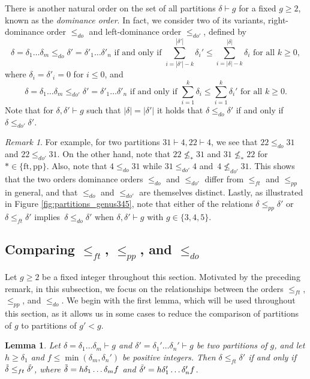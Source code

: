 \documentclass[11pt]{amsart}
\numberwithin{equation}{section}
\theoremstyle{plain}
\newcommand{\<}{\left \langle}
\renewcommand{\>}{\right \rangle}
\newtheorem{lem}[thm]{Lemma}
\theoremstyle{definition}
\theoremstyle{remark}
\newtheorem{rem}[thm]{Remark}
\begin{document}
There is another natural order on the set of all partitions $\delta \vdash g$ for a fixed $g\geq 2$, known as the \emph{dominance order}. In fact, we consider two of its variants, right-dominance order $\leq_{do}$ and left-dominance order $\leq_{do'}$, defined by
$$\delta = \delta_1\ldots\delta_m \leq_{do} \delta' = \delta'_1\ldots\delta'_n \text{ if and only if } \sum_{i = |\delta'| - k}^{|\delta'|} \delta_{i}' \leq \sum_{i = |\delta| - k}^{|\delta|} \delta_{i} \text{ for all } k \geq 0, $$
where $\delta_{i} = \delta'_{i} = 0$ for $i \leq 0$, and
$$\delta = \delta_1\ldots\delta_m \leq_{do'} \delta' = \delta'_1\ldots\delta'_n \text{ if and only if }\sum_{i = 1}^k \delta_{i} \leq \sum_{i = 1}^k \delta_{i}' \text{ for all } k \geq 0.$$
Note that for $\delta, \delta' \vdash g$ such that $|\delta| = |\delta'|$ it holds that $\delta \leq_{do} \delta'$ if and only if $\delta \leq_{do'} \delta'$. 
\begin{rem}
\label{rem:do}
For example, for two partitions $31\vdash 4, 22 \vdash 4$, we see that $22 \leq_{do} 31$ and $22 \leq_{do'} 31$. On the other hand, note that $22 \not\leq_{*} 31$ and $31 \not\leq_{*} 22$ for $* \in \{\text{ft}, \text{pp}\}$. Also, note that $4 \leq_{do} 31$ while $31 \leq_{do'} 4$ and~$4 \not \leq_{do'} 31$.
This shows that the two orders dominance orders $\leq_{do}$ and $\leq_{do'}$ differ from $\leq_{ft}$ and $\leq_{pp}$ in general, and that $\leq_{do}$ and $\leq_{do'}$ are themselves distinct. Lastly, as illustrated in Figure \ref{fig:partitions_genus345}, note that either of the relations $\delta \leq_{pp} \delta'$ or~$\delta \leq_{ft} \delta'$ implies~$\delta \leq_{do} \delta'$ when $\delta, \delta' \vdash g$ with $g \in \{3, 4, 5\}$. 
\end{rem}

\subsection{Comparing $\leq_{ft}$, $\leq_{pp}$, and $\leq_{do}$}

Let $g \geq 2$ be a fixed integer throughout this section. Motivated by the preceding remark, in this subsection, we focus on the relationships between the orders $\leq_{ft}$, $\leq_{pp}$, and $\leq_{do}$. 
We begin with the first lemma, which will be used throughout this section, as it allows us in some cases to reduce the comparison of partitions of $g$ to partitions of $g' < g$.  


\begin{lem}
Let $\delta = \delta_{1}\ldots\delta_m \vdash g$ and $\delta' = \delta_{1}'\ldots\delta_n' \vdash g$ be two partitions of $g$, and let $h \geq \delta_1$ and $f \leq \min(\delta_m, \delta_n')$ be positive integers. 
Then ${\delta} \leq_{ft} {\delta}'$ if and only if ${\Tilde{\delta}} \leq_{ft} {\Tilde{\delta'}}$, where $\Tilde{\delta} = h\delta_{1}\ldots\delta_m f$ and $\Tilde{\delta'} = h\delta_{1}'\ldots\delta_n'f$. 
\label{lemma:extension_delta}
\end{lem} 
\end{document}
